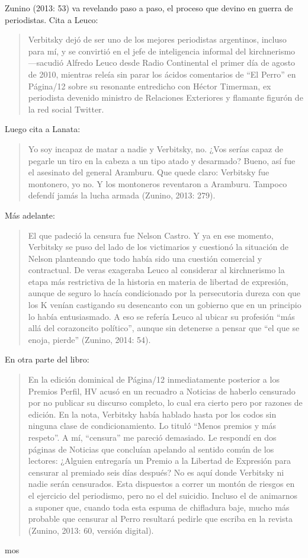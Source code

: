 Zunino (2013: 53) va revelando paso a paso, el proceso que devino en guerra de periodistas. Cita a Leuco:

\begin{quote}
Verbitsky dejó de ser uno de los mejores periodistas argentinos, incluso para mí, y se convirtió en el jefe de inteligencia informal del kirchnerismo ---sacudió Alfredo Leuco desde Radio Continental el primer día de agosto de 2010, mientras releía sin parar los ácidos comentarios de \enquote{El Perro} en Página/12 sobre su resonante entredicho con Héctor Timerman, ex periodista devenido ministro de Relaciones Exteriores y flamante figurón de la red social Twitter.
\end{quote}

Luego cita a Lanata:

\begin{quote}
Yo soy incapaz de matar a nadie y Verbitsky, no. ¿Vos serías capaz de pegarle un tiro en la cabeza a un tipo atado y desarmado? Bueno, así fue el asesinato del general Aramburu. Que quede claro: Verbitsky fue montonero, yo no. Y los montoneros reventaron a Aramburu. Tampoco defendí jamás la lucha armada (Zunino, 2013: 279).
\end{quote}

Más adelante:

\begin{quote}
El que padeció la censura fue Nelson Castro. Y ya en ese momento, Verbitsky se puso del lado de los victimarios y cuestionó la situación de Nelson planteando que todo había sido una cuestión comercial y contractual. De veras exageraba Leuco al considerar al kirchnerismo la etapa más restrictiva de la historia en materia de libertad de expresión, aunque de seguro lo hacía condicionado por la persecutoria dureza con que los K venían castigando su desencanto con un gobierno que en un principio lo había entusiasmado. A eso se refería Leuco al ubicar su profesión \enquote{más allá del corazoncito político}, aunque sin detenerse a pensar que \enquote{el que se enoja, pierde} (Zunino, 2014: 54).
\end{quote}

En otra parte del libro:

\begin{quote}
En la edición dominical de Página/12 inmediatamente posterior a los Premios Perfil, HV acusó en un recuadro a Noticias de haberlo censurado por no publicar su discurso completo, lo cual era cierto pero por razones de edición. En la nota, Verbitsky había hablado hasta por los codos sin ninguna clase de condicionamiento. Lo tituló \enquote{Menos premios y más respeto}. A mí, \enquote{censura} me pareció demasiado. Le respondí en dos páginas de Noticias que concluían apelando al sentido común de los lectores: ¿Alguien entregaría un Premio a la Libertad de Expresión para censurar al premiado seis días después? No es aquí donde Verbitsky ni nadie serán censurados. Esta dispuestos a correr un montón de riesgos en el ejercicio del periodismo, pero no el del suicidio. Incluso el de animarnos a suponer que, cuando toda esta espuma de chifladura baje, mucho más probable que censurar al Perro resultará pedirle que escriba en la revista (Zunino, 2013: 60, versión digital).
\end{quote}mos


